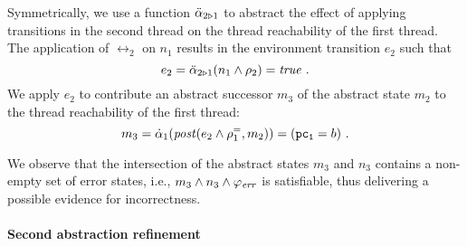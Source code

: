 Symmetrically, we use a function $\ddot{\alpha}_{2\triangleright 1}$ to abstract
the effect of applying transitions in the second thread on the thread
reachability of the first thread.
The application of $\rel_2$ on $n_1$ results in the environment
transition $e_2$ such that
%
\begin{equation*}
  e_2 = \ddot{\alpha}_{2\triangleright 1}(n_1 \land \rho_2) = \mathit{true}\ .
\end{equation*}
%
We apply $e_2$ to contribute an abstract successor $m_3$ of the
abstract state $m_2$ to the thread reachability of the first thread:
%
\begin{equation*}
  m_3 = \dot{\alpha}_{1}(\mathit{post}(e_2 \land \rho^=_{1}, m_2)) = (\mathtt{pc_1}=b)\ .
\end{equation*}
%

\iffalse
We denote by $\EnvTransOf{j}$ the set of all environment
transitions that are to be applied in thread $j\ $. 
For example, after the previous step, $\EnvTransOf{1} = \set{e_2}$ and
$\EnvTransOf{2} = \set{e_1}\ $.
The effect of the environment transitions $e_1$ and, respectively,
$e_2$ is to havoc the values of all program variables except $\pctwo$
and respectively $\pcone$ (local variables in the thread that applies
the environment transition).
%
\begin{equation*}
  \begin{array}[t]{r@{\arrSpace}l@{\arrSpace}l}
    m_3 & = \abst_1(\post(e_2 \land \pcone=\pcone', m_2)) & =(\pcone=b)\\[\jot]
    n_3 & = \abst_2(\post(e_1 \land \pctwo=\pctwo', n_2)) & =(\pctwo=q)\\[\jot]
  \end{array}
\end{equation*}
%
\fi

We observe that the intersection of the abstract states $m_3$ and
$n_3$ contains a non-empty set of error states, i.e., $m_3 \land n_3
\land \varphi_{\mathit{err}}$ is satisfiable, thus delivering a possible evidence
for incorrectness.


 
\paragraph{Second abstraction refinement} 


